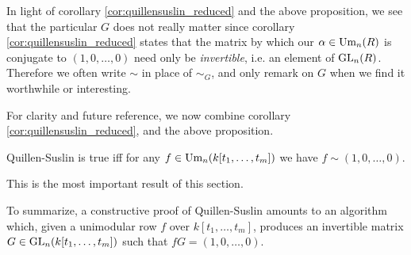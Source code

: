 \begin{remark}
  In light of corollary \ref{cor:quillensuslin_reduced} and the above proposition, we see that
  the particular $G$ does not really matter since corollary \ref{cor:quillensuslin_reduced} states that the matrix by which our $\alpha \in \text{Um}_n(R)$ is conjugate to $(1,0,\dots,0)$ need only be \emph{invertible},
  i.e. an element of $\text{GL}_n(R)$. Therefore we often write $\sim$ in place of $\sim_G$, and only remark on $G$ when we
  find it worthwhile or interesting.
\end{remark}

For clarity and future reference, we now combine corollary \ref{cor:quillensuslin_reduced}, and the above proposition.

\begin{corollary}
\label{cor:quillen_suslin_concrete}
  Quillen-Suslin is true iff for any $f \in \text{Um}_n(k[t_1, \dots, t_m])$ we have $f \sim (1,0,\dots,0)$.
\end{corollary}

This is the most important result of this section.

To summarize, a constructive proof of Quillen-Suslin amounts to an algorithm which, given a unimodular row $f$ over $k[t_1, \dots, t_m]$, produces an invertible matrix $G \in \text{GL}_n(k[t_1, \dots, t_m])$ such that $fG = (1,0,\dots,0)$.

